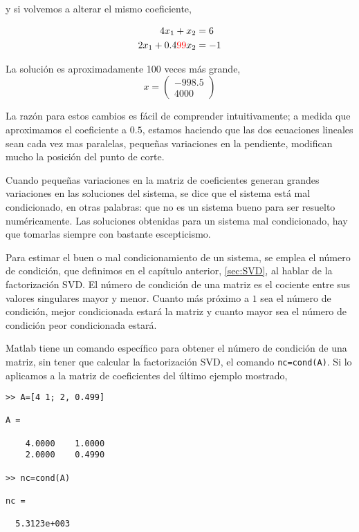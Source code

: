 y si volvemos a alterar el mismo coeficiente,

\begin{align*}
4x_1+x_2&=6\\
2x_1+0.4{\color{red}99} x_2&=-1
\end{align*}

La solución es aproximadamente 100 veces más grande,
\begin{equation*}
x=\begin{pmatrix}
-998.5\\
4000
\end{pmatrix}
\end{equation*}

La razón para estos cambios es fácil de comprender intuitivamente; a medida que aproximamos el coeficiente a $0.5$, estamos haciendo que las dos ecuaciones lineales sean cada vez mas paralelas, pequeñas variaciones en la pendiente, modifican mucho la posición del punto de corte.

Cuando pequeñas variaciones en la matriz de coeficientes generan grandes variaciones en las soluciones del sistema, se dice que el sistema está mal condicionado, en otras palabras: que no es un sistema bueno para ser resuelto numéricamente. Las soluciones obtenidas para un sistema mal condicionado, hay que tomarlas siempre con bastante escepticismo.

Para estimar el buen o mal condicionamiento de un sistema, se emplea el número de condición, que definimos en el capítulo anterior, \ref{sec:SVD}, al hablar de la factorización SVD. El número de condición de una matriz es el cociente entre sus valores singulares mayor y menor.  Cuanto más próximo a $1$ sea el número de condición, mejor condicionada estará la matriz y cuanto mayor sea el número de condición peor condicionada estará.

Matlab tiene un comando específico para obtener el número de condición de una matriz, sin tener que calcular la factorización SVD, el comando \texttt{nc=cond(A)}. Si lo aplicamos a la matriz de coeficientes del último ejemplo mostrado,

\begin{verbatim}
>> A=[4 1; 2, 0.499]

A =

    4.0000    1.0000
    2.0000    0.4990

>> nc=cond(A)

nc =

  5.3123e+003
\end{verbatim}

